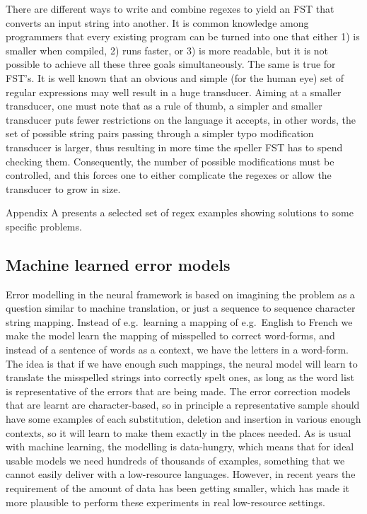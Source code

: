 \documentclass{flammie}
\begin{document}
There are different ways to write and combine regexes to yield an FST that
converts an input string into another. It is common knowledge among programmers
that every existing program can be turned into one that either 1) is smaller
when compiled, 2) runs faster, or 3) is more readable, but it is not possible to
achieve all these three goals simultaneously. The same is true for FST's. It is
well known that an obvious and simple (for the human eye) set of regular
expressions may well result in a huge transducer. Aiming at a smaller
transducer, one must note that as a rule of thumb, a simpler and smaller
transducer puts fewer restrictions on the language it accepts, in other words,
the set of possible string pairs passing through a simpler typo modification
transducer is larger, thus resulting in more time the speller FST has to spend
checking them. Consequently, the number of possible modifications must be
controlled, and this forces one to either complicate the regexes or allow the
transducer to grow in size.

Appendix A presents a selected set of regex examples showing solutions to some
specific problems.

\subsection{Machine learned error models}

Error modelling in the neural framework is based on imagining the problem as a
question similar to machine translation, or just a sequence to sequence
character string mapping. Instead of e.g.\ learning a mapping of e.g.\ English
to French we make the model learn the mapping of misspelled to correct
word-forms, and instead of a sentence of words as a context, we have the letters
in a word-form.  The idea is that if we have enough such mappings, the neural
model will learn to translate the misspelled strings into correctly spelt ones,
as long as the word list is representative of the errors that are being made.
The error correction models that are learnt are character-based, so in principle
a representative sample should have some examples of each substitution, deletion
and insertion in various enough contexts, so it will learn to make them exactly
in the places needed.  As is usual with machine learning, the modelling is
data-hungry, which means that for ideal usable models we need hundreds of
thousands of examples, something that we cannot easily deliver with a
low-resource languages.  However, in recent years the requirement of the amount
of data has been getting smaller, which has made it more plausible to perform
these experiments in real low-resource settings.
\end{document}
